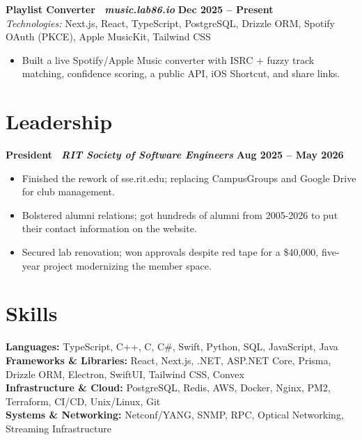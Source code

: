 \documentclass[10pt]{article}
\newcommand{\Role}[1]{{\youngserif\bfseries #1}}
\newcommand{\ResumeSection}[1]{\Needspace{3\baselineskip}\section*{#1}}
\newcommand{\Meta}[1]{{\youngserif\textbar{}\ \itshape\color{Slate}#1}}
\newcommand{\Date}[1]{{\youngserif\bfseries #1}}
\newcommand{\Tech}[1]{{\itshape Technologies:} #1}
\newcommand{\Action}[1]{{\color{Accent}#1}}
\begin{document}
{\Role{Playlist Converter \Meta{music.lab86.io}}} \hfill \Date{Dec 2025 -- Present} \\
\Tech{Next.js, React, TypeScript, PostgreSQL, Drizzle ORM, Spotify OAuth (PKCE), Apple MusicKit, Tailwind CSS}
\begin{itemize}
  \item Built a live \Action{Spotify/Apple Music converter} with \Action{ISRC + fuzzy track matching}, confidence scoring, a public API, iOS Shortcut, and share links.
\end{itemize}

\ResumeSection{Leadership}
{\Role{President \Meta{RIT Society of Software Engineers}}} \hfill \Date{Aug 2025 -- May 2026}
\begin{itemize}
  \item Finished the \Action{rework of sse.rit.edu}; replacing CampusGroups and Google Drive for club management.
  \item Bolstered alumni relations; got \Action{hundreds of alumni from 2005-2026} to put their contact information on the website.
  \item Secured lab renovation; won approvals despite red tape for a \Action{\$40,000, five-year} project modernizing the member space.
\end{itemize}

\ResumeSection{Skills}
{\youngserif\bfseries Languages:} TypeScript, C++, C, C\#, Swift, Python, SQL, JavaScript, Java \\
{\youngserif\bfseries Frameworks \& Libraries:} React, Next.js, .NET, ASP.NET Core, Prisma, Drizzle ORM, Electron, SwiftUI, Tailwind CSS, Convex \\
{\youngserif\bfseries Infrastructure \& Cloud:} PostgreSQL, Redis, AWS, Docker, Nginx, PM2, Terraform, CI/CD, Unix/Linux, Git \\
{\youngserif\bfseries Systems \& Networking:} Netconf/YANG, SNMP, RPC, Optical Networking, Streaming Infrastructure
\end{document}
